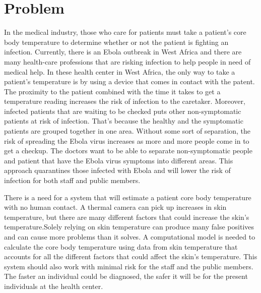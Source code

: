 \documentclass{article}
\begin{document}
\section{Problem}
In the medical industry, those who care for patients must take a patient’s core body temperature to determine whether or not the patient is fighting an infection. Currently, there is an Ebola outbreak in West Africa and there are many health-care professions that are risking infection to help people in need of medical help. In these health center in West Africa, the only way to take a patient's temperature is by using a device that comes in contact with the patent. The proximity to the patient combined with the time it takes to get a temperature reading increases the risk of infection to the caretaker. Moreover, infected patients that are waiting to be checked puts other non-symptomatic patients at risk of infection. That’s because the healthy and the symptomatic patients are grouped together in one area. Without some sort of separation, the risk of spreading the Ebola virus increases as more and more people come in to get a checkup.
The doctors want to be able to separate non-symptomatic people and patient that have the Ebola virus symptoms into different areas. This approach quarantines those infected with Ebola and will lower the risk of infection for both staff and public members. 
\par 
There is a need for a system that will estimate a patient core body temperature with no human contact. A thermal camera can pick up increases in skin temperature, but there are many different factors that could increase the skin’s temperature.Solely relying on skin temperature can produce many false positives and can cause more problems than it solves. A computational model is needed to calculate the core body temperature using data from skin temperature that accounts for all the different factors that could affect the skin’s temperature. This system should also work with minimal risk for the staff and the public members. The faster an individual could be diagnosed, the safer it will be for the present individuals at the health center.
  \par
\end{document}
